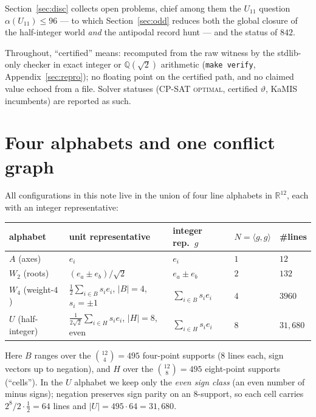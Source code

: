 \documentclass[11pt]{article}
\theoremstyle{remark}
\newcommand{\RR}{\mathbb{R}}
\newcommand{\QQ}{\mathbb{Q}}
\begin{document}
Section~\ref{sec:disc} collects open problems, chief among them the
$U_{11}$ question $\alpha(U_{11})\le 96$ --- to which Section~\ref{sec:odd}
reduces both the global closure of the half-integer world \emph{and} the
antipodal record hunt --- and the status of $842$.

Throughout, ``certified'' means: recomputed from the raw witness by the
stdlib-only checker in exact integer or $\QQ(\sqrt2)$ arithmetic
(\texttt{make verify}, Appendix~\ref{sec:repro}); no floating point on the
certified path, and no claimed value echoed from a file. Solver statuses
(CP-SAT \textsc{optimal}, certified $\vartheta$, KaMIS incumbents) are
reported as such.

\section{Four alphabets and one conflict graph}\label{sec:alphabets}

All configurations in this note live in the union of four line alphabets in
$\RR^{12}$, each with an integer representative:
\begin{center}
\begin{tabular}{@{}lllll@{}}
\toprule
alphabet & unit representative & integer rep.\ $g$ & $N=\langle g,g\rangle$ & \#lines \\
\midrule
$A$ (axes) & $e_i$ & $e_i$ & $1$ & $12$ \\
$W_2$ (roots) & $(e_a\pm e_b)/\sqrt2$ & $e_a\pm e_b$ & $2$ & $132$ \\
$W_4$ (weight-$4$) & $\tfrac12\sum_{i\in B}s_ie_i$, $|B|=4$, $s_i=\pm1$ & $\sum_{i\in B}s_ie_i$ & $4$ & $3960$ \\
$U$ (half-integer) & $\tfrac1{2\sqrt2}\sum_{i\in H}s_ie_i$, $|H|=8$, even & $\sum_{i\in H}s_ie_i$ & $8$ & $31{,}680$ \\
\bottomrule
\end{tabular}
\end{center}
Here $B$ ranges over the $\binom{12}{4}=495$ four-point supports ($8$ lines
each, sign vectors up to negation), and $H$ over the $\binom{12}{8}=495$
eight-point supports (``cells''). In the $U$ alphabet we keep only the
\emph{even sign class} (an even number of minus signs); negation preserves
sign parity on an $8$-support, so each cell carries
$2^8/2\cdot\tfrac12=64$ lines and $|U|=495\cdot 64=31{,}680$.
\end{document}
